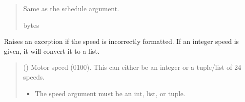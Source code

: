 \documentclass[letterpaper,10pt,english]{sphinxmanual}
\begin{document}
\begin{fulllineitems}
\begin{fulllineitems}
\begin{quote}
\begin{description}
\begin{itemize}
\end{itemize}

\sphinxAtStartPar
Same as the schedule argument.

\sphinxAtStartPar
bytes

\end{description}\end{quote}

\end{fulllineitems}


\begin{fulllineitems}
\label{\detokenize{PodApi.Devices:PodApi.Devices.PodDevice_8229.Pod8229._Validate_Speed}}
\pysigstartsignatures
{}
\pysigstopsignatures
\sphinxAtStartPar
Raises an exception if the speed is incorrectly formatted. If an integer speed         is given, it will convert it to a list.
\begin{quote}\begin{description}
\sphinxAtStartPar
{} (\sphinxstyleliteralemphasis{\sphinxupquote{ | }}\sphinxstyleliteralemphasis{\sphinxupquote{ | }}\sphinxstyleliteralemphasis{\sphinxupquote{{[}}}\sphinxstyleliteralemphasis{\sphinxupquote{{]}}}) \textendash{} Motor speed (0\sphinxhyphen{}100). This can either be an                 integer or a tuple/list of 24 speeds.

\begin{itemize}
\item {} 
\sphinxAtStartPar
{} \textendash{} The speed argument must be an int, list, or tuple.


\end{itemize}
\end{description}
\end{quote}
\end{fulllineitems}
\end{fulllineitems}
\end{document}

